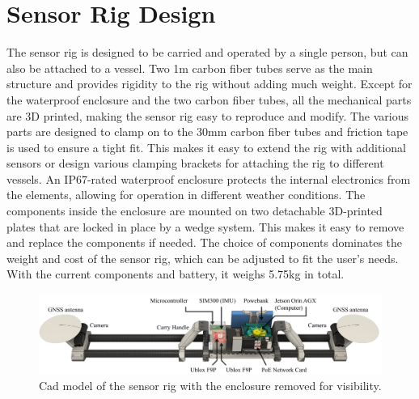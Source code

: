\section{Sensor Rig Design}
The sensor rig is designed to be carried and operated by a single person, but can also be attached to a vessel.
Two 1m carbon fiber tubes serve as the main structure and provides rigidity to the rig without adding much weight.
Except for the waterproof enclosure and the two carbon fiber tubes, all the mechanical parts are 3D printed, making the sensor rig easy to reproduce and modify.
The various parts are designed to clamp on to the 30mm carbon fiber tubes and friction tape is used to ensure a tight fit.
This makes it easy to extend the rig with additional sensors or design various clamping brackets for attaching the rig to different vessels.
An IP67-rated waterproof enclosure protects the internal electronics from the elements, allowing for operation in different weather conditions.
The components inside the enclosure are mounted on two detachable 3D-printed plates that are locked in place by a wedge system. This makes it easy to remove and replace the components if needed.
The choice of components dominates the weight and cost of the sensor rig, which can be adjusted to fit the user's needs.
With the current components and battery, it weighs 5.75kg in total.

\begin{figure}[H]
    \centering
    \includegraphics[width=\textwidth]{figures/rig_components.pdf}
    \caption{Cad model of the sensor rig with the enclosure removed for visibility.}
\end{figure}

